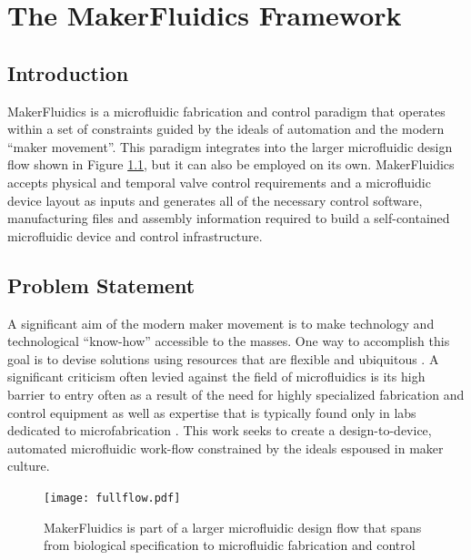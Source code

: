 \chapter{The MakerFluidics Framework}
\label{chapter:mf}
\thispagestyle{myheadings}

\graphicspath{{2_MakerFluidics/Figures/}}

\section{Introduction}
\label{sec:mfIntro}

MakerFluidics is a microfluidic fabrication and control paradigm that operates within a set of constraints guided by the ideals of automation and the modern ``maker movement''. This paradigm integrates into the larger microfluidic design flow shown in Figure \ref{fig:fullflow}, but it can also be employed on its own. MakerFluidics accepts physical and temporal valve control requirements and a microfluidic device layout as inputs and generates all of the necessary control software, manufacturing files and assembly information required to build a self-contained microfluidic device and control infrastructure.

\section{Problem Statement}
\label{sec:mfPS}
A significant aim of the modern maker movement is to make technology and technological ``know-how'' accessible to the masses. One way to accomplish this goal is to devise solutions using resources that are flexible and ubiquitous \cite{schrock2014education}. A significant criticism often levied against the field of microfluidics is its high barrier to entry often as a result of the need for highly specialized fabrication and control equipment as well as expertise that is typically found only in labs dedicated to microfabrication \cite{whitesides2006}. This work seeks to create a design-to-device, automated microfluidic work-flow constrained by the ideals espoused in maker culture. 

\begin{figure}[h]
  \begin{minipage}[t]{0.99\linewidth}\centering
    \texttt{[image: fullflow.pdf]}
    \medskip
  \end{minipage}\hfill
  \caption[Specify--Design--Build Workflow]{MakerFluidics is part of a larger microfluidic design flow that spans from biological specification to microfluidic fabrication and control}
    \label{fig:fullflow}
\end{figure}


